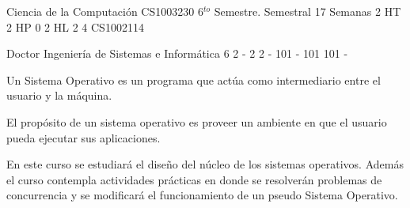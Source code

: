 \documentclass[a4paper,8pt]{article}
\begin{document}
\setNombreProfesor{}
\setGradoProfesorAbreviado{}
\sylabusHeader

\academicaTable
{Ciencia de la Computación} %
{CS1003230} %
{6$^{to}$ Semestre.} %
{Semestral} %
{17 Semanas} %
{2 HT} %
{2 HP} %
{0} %
{2 HL}  %
{2} %
{4} %
{CS1002114} %

\administrativaTable
{Doctor} %
{Ingeniería de Sistemas e Informática} %
{6} %
{2} %
{-} %
{2} %
{2} %
{-} %
{101} %
{-} %
{101} %
{101} %
{-} %


\begin{fundamentacion}
Un Sistema Operativo es un programa que actúa como intermediario entre el usuario y la máquina.

El propósito de un sistema operativo es proveer un ambiente en que el usuario pueda ejecutar sus aplicaciones.

En este curso se estudiará el diseño del núcleo de los sistemas operativos.
Además el curso contempla actividades prácticas en donde se resolverán problemas de
concurrencia y se modificará el funcionamiento de un pseudo Sistema Operativo.

\end{fundamentacion}

\begin{sumilla}
\item \OSOverviewofOperatingSystems
\item \OSOperatingSystemPrinciples
\item \OSConcurrency
\item \OSSchedulingandDispatch
\item \OSMemoryManagement
\item \OSSecurityandProtection
\item \OSVirtualMachines
\item \OSDeviceManagement
\item \OSFileSystems
\item \OSRealTimeandEmbeddedSystems
\item \OSFaultTolerance
\item \OSSystemPerformanceEvaluation

\end{sumilla}
\end{document}
